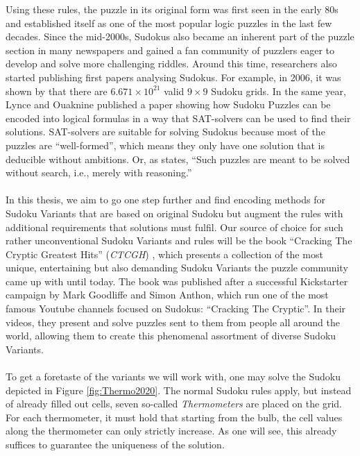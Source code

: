 Using these rules, the puzzle in its original form was first seen in the early 80s and established itself as one of the most popular logic puzzles in the last few decades. Since the mid-2000s, Sudokus also became an inherent part of the puzzle section in many newspapers and gained a fan community of puzzlers eager to develop and solve more challenging riddles. Around this time, researchers also started publishing first papers analysing Sudokus. For example, in 2006, it was shown by \cite{jarvis2006mathematics} that there are $6.671\times 10^{21}$ valid $9\times 9$ Sudoku grids. In the same year, Lynce and Ouaknine published a paper \cite{Lynce2006SudokuAsASATProblem} showing how Sudoku Puzzles can be encoded into logical formulas in a way that SAT-solvers can be used to find their solutions. SAT-solvers are suitable for solving Sudokus because most of the puzzles are “well-formed”, which means they only have one solution that is deducible without ambitions. Or, as \cite{Lynce2006SudokuAsASATProblem} states, ``Such puzzles are meant to be solved without search, i.e., merely with reasoning.''\\
\\
In this thesis, we aim to go one step further and find encoding methods for Sudoku Variants that are based on original Sudoku but augment the rules with additional requirements that solutions must fulfil. Our source of choice for such rather unconventional Sudoku Variants and rules will be the book ``Cracking The Cryptic Greatest Hits'' (\emph{CTCGH}) \cite{CrackingTheCryptic2021}, which presents a collection of the most unique, entertaining but also demanding Sudoku Variants the puzzle community came up with until today. The book was published after a successful Kickstarter campaign by Mark Goodliffe and Simon Anthon, which run one of the most famous Youtube channels focused on Sudokus: ``Cracking The Cryptic''\cite{ChannelCrackingTheCryptic}. In their videos, they present and solve puzzles sent to them from people all around the world, allowing them to create this phenomenal assortment of diverse Sudoku Variants.\\
\\
To get a foretaste of the variants we will work with, one may solve the Sudoku depicted in Figure \ref{fig:Thermo2020}. The normal Sudoku rules apply, but instead of already filled out cells, seven so-called \emph{Thermometers} are placed on the grid. For each thermometer, it must hold that starting from the bulb, the cell values along the thermometer can only strictly increase. As one will see, this already suffices to guarantee the uniqueness of the solution.\\
